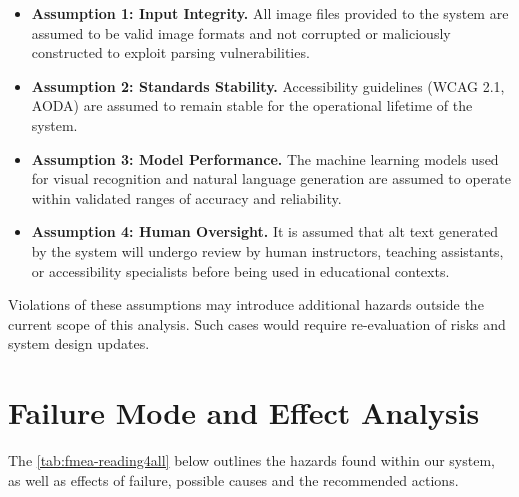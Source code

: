 \documentclass{article}
\begin{document}
\begin{itemize}
  \item \textbf{Assumption 1: Input Integrity.} All image files provided
    to the system are assumed to be valid image formats and not corrupted
    or maliciously constructed to exploit parsing vulnerabilities.

  \item \textbf{Assumption 2: Standards Stability.} Accessibility
    guidelines (WCAG 2.1, AODA) are assumed to remain stable for the
    operational lifetime of the system.

  \item \textbf{Assumption 3: Model Performance.} The machine learning
    models used for visual recognition and natural language generation are
    assumed to operate within validated ranges of accuracy and reliability.

  \item \textbf{Assumption 4: Human Oversight.} It is assumed that
    alt text generated by the system will undergo review by human
    instructors, teaching assistants, or accessibility specialists before
    being used in educational contexts.
\end{itemize}

Violations of these assumptions may introduce additional hazards outside
the current scope of this analysis. Such cases would require
re-evaluation of risks and system design updates.

\section{Failure Mode and Effect Analysis}
The \autoref{tab:fmea-reading4all} below outlines the hazards found within our system, as well as effects of failure, possible causes and the recommended actions. 
\end{document}
